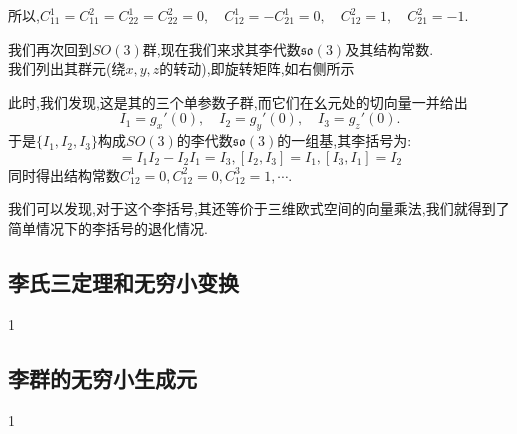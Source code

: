 \begin{example}
\begin{equation}
    \end{equation}
    所以,$C_{11}^1=C_{11}^2=C_{22}^1=C_{22}^2=0,\quad C_{12}^1=-C_{21}^1=0,\quad C_{12}^2=1,\quad C_{21}^2=-1.$
\end{example}
\begin{example}
    我们再次回到$SO(3)$群,现在我们来求其李代数$\mathfrak{so}(3)$及其结构常数.\\
    我们列出其群元(绕$x,y,z$的转动),即旋转矩阵,如右侧所示

    此时,我们发现,这是其的三个单参数子群,而它们在幺元处的切向量一并给出
    \begin{equation}
        I_{1}=g_{x}'(0),\quad I_{2}=g_{y}'(0),\quad I_{3}=g_{z}'(0).
    \end{equation}
    于是$\{I_1,I_2,I_3\}$构成$SO(3)$的李代数$\mathfrak{so}(3)$的一组基,其李括号为:
    \begin{equation}
        [I_1,I_2]=I_1I_2-I_2I_1=I_3,[I_2,I_3]=I_1,[I_3,I_1]=I_2
    \end{equation}
    同时得出结构常数$C_{12}^{ 1}=0,C_{12}^{ 2}=0,C_{12}^{ 3}=1,\cdots.$
    
    我们可以发现,对于这个李括号,其还等价于三维欧式空间的向量乘法,我们就得到了简单情况下的李括号的退化情况.
\end{example}

\subsection{李氏三定理和无穷小变换}
1
\subsection{李群的无穷小生成元}
1
